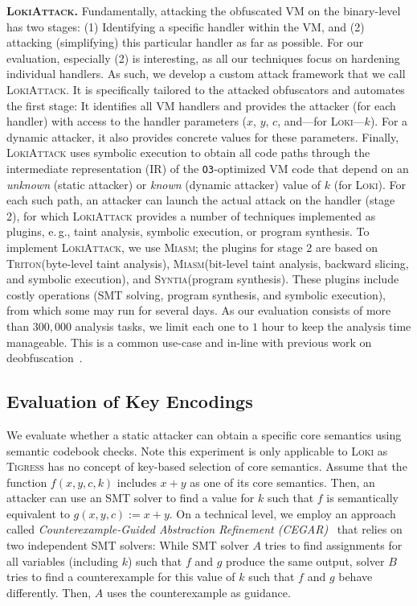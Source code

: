 \documentclass[letterpaper,twocolumn,10pt]{article}
\newcommand{\eg}{e.\,g.,\xspace}
\theoremstyle{customexample}
\theoremstyle{customexperiment}
\newcommand{\loki}{\textsc{Loki}\xspace}
\newcommand{\lokiattack}{\textsc{LokiAttack}\xspace}
\newcommand{\syntia}{\textsc{Syntia}\xspace}
\newcommand{\tigress}{\textsc{Tigress}\xspace}
\newcommand{\miasm}{\textsc{Miasm}\xspace}
\newcommand{\triton}{\textsc{Triton}\xspace}
\begin{document}
\textbf{\lokiattack{}.} 
Fundamentally, attacking the obfuscated VM on the binary-level has two stages: (1) Identifying a specific handler within the VM, and (2) attacking (simplifying) this particular handler as far as possible. For our evaluation, especially (2) is interesting, as all our techniques focus on hardening individual handlers. As such, we develop a custom attack framework that we call \lokiattack. It is specifically tailored to the attacked obfuscators and automates the first stage: It identifies all VM handlers and provides the attacker (for each handler) with access to the handler parameters ($x$, $y$, $c$, and---for \loki---$k$). For a dynamic attacker, it also provides concrete values for these parameters. Finally, \lokiattack uses symbolic execution to obtain all code paths through the intermediate representation (IR) of the \texttt{O3}-optimized VM code that depend on an \emph{unknown} (static attacker) or \emph{known} (dynamic attacker) value of $k$ (for \loki). For each such path, an attacker can launch the actual attack on the handler (stage 2), for which \lokiattack provides a number of techniques implemented as plugins, \eg taint analysis, symbolic execution, or program synthesis. To implement \lokiattack, we use \miasm; the plugins for stage 2 are based on \triton (byte-level taint analysis), \miasm (bit-level taint analysis, backward slicing, and symbolic execution), and \syntia (program synthesis).
These plugins include costly operations (SMT solving, program synthesis, and symbolic execution), from which some may run for several days. As our evaluation consists of more than $300,000$ analysis tasks, we limit each one to $1$ hour to keep the analysis time manageable. This is a common use-case and in-line with previous work on deobfuscation~\cite{blazytko2017syntia,bardin2017backward,menguy2021xyntia}.

\subsection{Evaluation of Key Encodings}
We evaluate whether a static attacker can obtain a specific core semantics using semantic codebook checks. Note this experiment is only applicable to \loki as \tigress has no concept of key-based selection of core semantics. Assume that the function $f(x,y,c,k)$ includes $x + y$ as one of its core semantics. Then, an attacker can use an SMT solver to find a value for $k$ such that $f$ is semantically equivalent to $g(x,y,c) := x + y$.
On a technical level, we employ an approach called \emph{Counterexample-Guided Abstraction Refinement (CEGAR)}~\cite{cegar,cegarsmc} that relies on two independent SMT solvers: While SMT solver $A$ tries to find assignments for all variables (including $k$) such that $f$ and $g$ produce the same output, solver $B$ tries to find a counterexample for this value of $k$ such that $f$ and $g$ behave differently. Then, $A$ uses the counterexample as guidance. 
\end{document}
